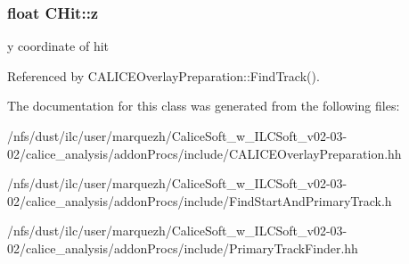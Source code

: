 \subsubsection[{z}]{\setlength{\rightskip}{0pt plus 5cm}float C\-Hit\-::z}\label{classCHit_ab1d439b8468fc38824edd2242475458e}
y coordinate of hit 

Referenced by C\-A\-L\-I\-C\-E\-Overlay\-Preparation\-::\-Find\-Track().



The documentation for this class was generated from the following files\-:\begin{DoxyCompactItemize}
\item 
/nfs/dust/ilc/user/marquezh/\-Calice\-Soft\-\_\-w\-\_\-\-I\-L\-C\-Soft\-\_\-v02-\/03-\/02/calice\-\_\-analysis/addon\-Procs/include/C\-A\-L\-I\-C\-E\-Overlay\-Preparation.\-hh\item 
/nfs/dust/ilc/user/marquezh/\-Calice\-Soft\-\_\-w\-\_\-\-I\-L\-C\-Soft\-\_\-v02-\/03-\/02/calice\-\_\-analysis/addon\-Procs/include/Find\-Start\-And\-Primary\-Track.\-h\item 
/nfs/dust/ilc/user/marquezh/\-Calice\-Soft\-\_\-w\-\_\-\-I\-L\-C\-Soft\-\_\-v02-\/03-\/02/calice\-\_\-analysis/addon\-Procs/include/Primary\-Track\-Finder.\-hh\end{DoxyCompactItemize}
